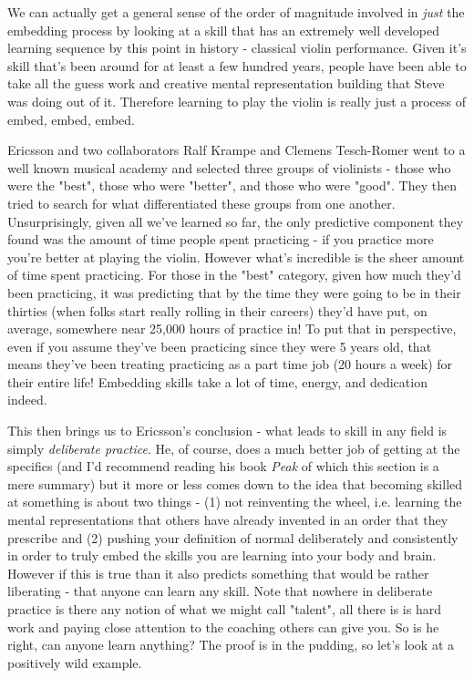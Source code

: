 \documentclass[11pt,a5paper]{book}
\begin{document}
We can actually get a general sense of the order of magnitude involved in \textit{just} the embedding process by looking at a skill that has an extremely well developed learning sequence by this point in history - classical violin performance. Given it's skill that's been around for at least a few hundred years, people have been able to take all the guess work and creative mental representation building that Steve was doing out of it. Therefore learning to play the violin is really just a process of embed, embed, embed. 
\newline

Ericsson and two collaborators Ralf Krampe and Clemens Tesch-Romer went to a well known musical academy and selected three groups of violinists - those who were the "best", those who were "better", and those who were "good". They then tried to search for what differentiated these groups from one another. Unsurprisingly, given all we've learned so far, the only predictive component they found was the amount of time people spent practicing - if you practice more you're better at playing the violin. However what's incredible is the sheer amount of time spent practicing. For those in the "best" category, given how much they'd been practicing, it was predicting that by the time they were going to be in their thirties (when folks start really rolling in their careers) they'd have put, on average, somewhere near 25,000 hours of practice in! To put that in perspective, even if you assume they've been practicing since they were 5 years old, that means they've been treating practicing as a part time job (20 hours a week) for their entire life! Embedding skills take a lot of time, energy, and dedication indeed.
\newline

This then brings us to Ericsson's conclusion - what leads to skill in any field is simply \textit{deliberate practice}. He, of course, does a much better job of getting at the specifics (and I'd recommend reading his book \textit{Peak} \cite{ericsson} of which this section is a mere summary) but it more or less comes down to the idea that becoming skilled at something is about two things - (1) not reinventing the wheel, i.e. learning the mental representations that others have already invented in an order that they prescribe and (2) pushing your definition of normal deliberately and consistently in order to truly embed the skills you are learning into your body and brain. However if this is true than it also predicts something that would be rather liberating - that anyone can learn any skill. Note that nowhere in deliberate practice is there any notion of what we might call "talent", all there is is hard work and paying close attention to the coaching others can give you. So is he right, can anyone learn anything? The proof is in the pudding, so let's look at a positively wild example.
\newline
\end{document}
